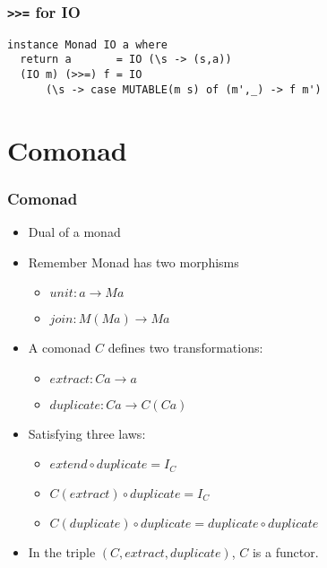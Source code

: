 \documentclass{beamer} %
\begin{document}
\begin{frame}[fragile]\frametitle{\texttt{>>=} for IO}
\begin{verbatim}
instance Monad IO a where
  return a       = IO (\s -> (s,a))
  (IO m) (>>=) f = IO
      (\s -> case MUTABLE(m s) of (m',_) -> f m')
\end{verbatim}
\end{frame}

\section{Comonad}

\begin{frame}[fragile]\frametitle{Comonad}
  \begin{itemize}
    \item Dual of a monad


    \item Remember Monad has two morphisms
      \begin{itemize}
        \item $\mathit{unit} : a \rightarrow M a$
        \item $\mathit{join} : M (M a) \rightarrow M a$
      \end{itemize}

    \item A comonad $C$ defines two transformations:
      \begin{itemize}
        \item $\mathit{extract} : C a \rightarrow a$

        \item $\mathit{duplicate}  : C a \rightarrow C (C a)$
      \end{itemize}
    \item Satisfying three laws:
      \begin{itemize}
        \item $\mathit{extend} \circ \mathit{duplicate} = I_C$
        \item $C(\mathit{extract}) \circ \mathit{duplicate} = I_C$
        \item $C(\mathit{duplicate}) \circ \mathit{duplicate} = \mathit{duplicate}
          \circ \mathit{duplicate}$
      \end{itemize}
    \item In the triple $(C,\mathit{extract},\mathit{duplicate})$, $C$ is a functor.
  \end{itemize}
\end{frame}
\end{document}
